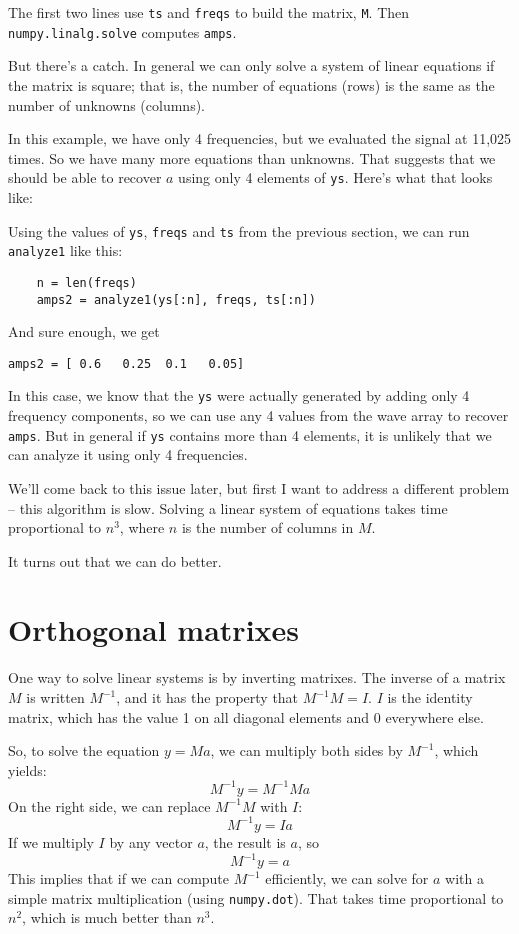 \documentclass[12pt]{book}
\begin{document}
The first two lines use {\tt ts} and {\tt freqs} to build the
matrix, {\tt M}.  Then {\tt numpy.linalg.solve} computes {\tt amps}.

But there's a catch.  In general we can only solve a system of linear
equations if the matrix is square; that is, the number of equations
(rows) is the same as the number of unknowns (columns).

In this example, we have only 4 frequencies, but we evaluated the
signal at 11,025 times.  So we have many more equations than unknowns.
That suggests that we should be able to recover $a$ using only
4 elements of {\tt ys}.  Here's what that looks like:

Using the values of {\tt ys}, {\tt freqs} and {\tt ts} from
the previous section, we can run {\tt analyze1} like this:

\begin{verbatim}
    n = len(freqs)
    amps2 = analyze1(ys[:n], freqs, ts[:n])
\end{verbatim}

And sure enough, we get

\begin{verbatim}
amps2 = [ 0.6   0.25  0.1   0.05]
\end{verbatim}

In this case, we know that the {\tt ys} were actually generated by
adding only 4 frequency components, so we can use any 4 values from
the wave array to recover {\tt amps}.  But in general if {\tt ys}
contains more than 4 elements, it is unlikely that we can analyze it
using only 4 frequencies.

We'll come back to this issue later, but first I want to address
a different problem -- this algorithm is slow.  Solving a linear
system of equations takes time proportional to $n^3$, where $n$ is
the number of columns in $M$.

It turns out that we can do better.


\section{Orthogonal matrixes}

One way to solve linear systems is by inverting matrixes.  The
inverse of a matrix $M$ is written $M^{-1}$, and it has the property
that $M^{-1}M = I$.  $I$ is the identity matrix, which has
the value 1 on all diagonal elements and 0 everywhere else.

So, to solve the equation $y = Ma$, we can multiply both sides by
$M^{-1}$, which yields:
%
\[ M^{-1}y = M^{-1} M a \]
%
On the right side, we can replace $M^{-1}M$ with $I$:
%
\[ M^{-1}y = I a \]
%
If we multiply $I$ by any vector $a$, the result is $a$, so  
%
\[ M^{-1}y = a \]
%
This implies that if we can compute $M^{-1}$ efficiently, we can solve
for $a$ with a simple matrix multiplication (using {\tt numpy.dot}).
That takes time proportional to $n^2$, which is much better than
$n^3$.
\end{document}
